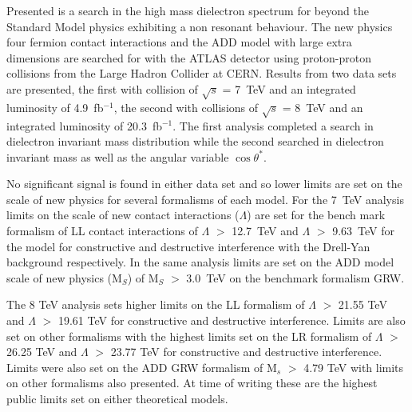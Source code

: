 

Presented is a search in the high mass dielectron spectrum for beyond the Standard Model physics exhibiting a non resonant behaviour. The new physics four fermion contact interactions and the ADD model with large extra dimensions are searched for with the ATLAS detector using proton-proton collisions from the Large Hadron Collider at CERN. Results from two data sets are presented, the first with collision of $\sqrt{s}$ = 7~TeV and an integrated luminosity of 4.9~fb$^{-1}$, the second with collisions of $\sqrt{s}$ = 8~TeV and an integrated luminosity of 20.3~fb$^{-1}$. The first analysis completed a search in dielectron invariant mass distribution while the second searched in dielectron invariant mass as well as the angular variable $\cos{\theta^{*}}$. 

No significant signal is found in either data set and so lower limits are set on the scale of new physics for several formalisms of each model. 
For the 7~TeV analysis limits on the scale of new contact interactions ($\Lambda$) are set for the bench mark formalism of LL contact interactions of $\Lambda$ $>$ 12.7~TeV and $\Lambda$ $>$ 9.63~TeV for the model for constructive and destructive interference with the Drell-Yan background respectively. In the same analysis limits are set on the ADD model scale of new physics (M$_{S}$) of M$_{S}$ $>$ 3.0~TeV on the benchmark formalism GRW.

The 8 TeV analysis sets higher limits on the LL formalism of $\Lambda$ $>$ 21.55 TeV and $\Lambda$ $>$ 19.61 TeV for constructive and destructive interference. Limits are also set on other formalisms with the highest limits set on the LR formalism of $\Lambda$ $>$ 26.25 TeV and $\Lambda$ $>$ 23.77 TeV for constructive and destructive interference. Limits were also set on the ADD GRW formalism of M$_{s}$ $>$ 4.79 TeV with limits on other formalisms also presented. At time of writing these are the highest public limits set on either theoretical models.



